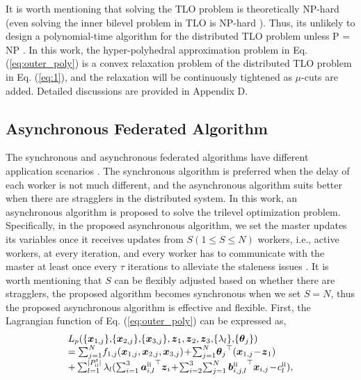 \documentclass[letterpaper]{article} %
\begin{document}
It is worth mentioning that solving the TLO problem is theoretically NP-hard (even solving the inner bilevel problem in TLO is NP-hard \cite{ben1990computational}). Thus, its unlikely to design a polynomial-time algorithm for the distributed TLO problem unless P = NP \cite{arora2009computational}.  In this work, the hyper-polyhedral
approximation problem in Eq. (\ref{eq:outer_poly}) is a convex relaxation problem of the distributed TLO problem in Eq. (\ref{eq:1}), and the relaxation will be continuously tightened as $\mu$-cuts are added. Detailed discussions are provided in Appendix D.


\subsection{Asynchronous Federated Algorithm}
The synchronous and asynchronous federated algorithms have different application scenarios \cite{su2022gba}. The synchronous algorithm is preferred when the delay of each worker is not much different, and the asynchronous algorithm suits better when there are stragglers in the distributed system. In this work, an asynchronous algorithm is proposed to solve the trilevel optimization problem. Specifically, in the proposed asynchronous algorithm, we set the master
updates its variables once it receives updates from $S (1\le S \le N)$ workers, i.e., active workers, at every iteration, and every
worker has to communicate with the master at least once every $\tau$ iterations to alleviate the staleness issues \cite{zhang2014asynchronous}. It is worth mentioning that $S$ can be flexibly adjusted based on whether there are stragglers, the proposed algorithm becomes synchronous when we set $S=N$, thus the proposed asynchronous algorithm is effective and flexible. First, the Lagrangian function of Eq. (\ref{eq:outer_poly}) can be expressed as,
\begin{equation}
\begin{array}{l}
L_p(\{{\boldsymbol{x}_{1,j}}\} ,\!\{{\boldsymbol{x}_{2,j}}\} ,\!\{{\boldsymbol{x}_{3,j}}\} ,{\boldsymbol{z}_1},{\boldsymbol{z}_2},{\boldsymbol{z}_3},\! \{\lambda_l\}, \!\{\boldsymbol{\theta}_j\} ) \\

= \sum\nolimits_{j = 1}^N \! {{f_{1,j}}({\boldsymbol{x}_{1,j}},{\boldsymbol{x}_{2,j}},{\boldsymbol{x}_{3,j}})} \! +\! \sum\nolimits_{j = 1}^N \!{{\boldsymbol{\theta}_j}}^{\top} ({\boldsymbol{x}_{1,j}}\! -\! {\boldsymbol{z}_1})\\

+ \sum\nolimits_{l = 1}^{|P_{{\rm{\uppercase\expandafter{\romannumeral2}}}}^{t}|} {{\lambda _l}} ({\sum\nolimits_{i = 1}^3 {\boldsymbol{a}_{i,l}^{{\rm{\uppercase\expandafter{\romannumeral2}}}}} ^{\top}}{\boldsymbol{z}_i} \!+\! \sum\nolimits_{i = 2}^3 \! {\sum\nolimits_{j = 1}^N {\boldsymbol{b}{{_{i,j,l}^{{\rm{\uppercase\expandafter{\romannumeral2}}}}}^{\top}}{\boldsymbol{x}_{i,j}}} } \! -\! c_l^{{\rm{\uppercase\expandafter{\romannumeral2}}}}),
\end{array}
\end{equation}
\end{document}
